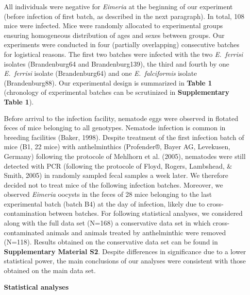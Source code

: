 \documentclass[12pt]{article}
\renewcommand{\_}{\kern-1.5pt\textunderscore\kern-1.5pt}
\begin{document}
All individuals were negative for \textit{Eimeria }at the beginning of our experiment (before infection of first batch, as described in the next paragraph). In total, 108 mice were infected. Mice were randomly allocated to experimental groups ensuring homogeneous distribution of ages and sexes between groups. Our experiments were conducted in four (partially overlapping) consecutive batches for logistical reasons. The first two batches were infected with the two \textit{E. ferrisi }isolates (Brandenburg64 and Brandenburg139), the third and fourth by one \textit{E. ferrisi }isolate (Brandenburg64) and one \textit{E. falciformis }isolate (Brandenburg88). Our experimental design is summarized in \textbf{Table 1} (chronology of experimental batches can be scrutinized in \textbf{Supplementary Table 1}). \par

Before arrival to the infection facility, nematode eggs were observed in flotated feces of mice belonging to all genotypes. Nematode infection is common in breeding facilities (Baker, 1998). Despite treatment of the first infection batch of mice (B1, 22 mice) with anthelminthics (Profender®, Bayer AG, Levekusen, Germany) following the protocole of Mehlhorn et al. (2005), nematodes were still detected with PCR (following the protocole of Floyd, Rogers, Lambshead, $\&$  Smith, 2005) in randomly sampled fecal samples a week later. We therefore decided not to treat mice of the following infection batches. Moreover, we observed \textit{Eimeria }oocysts in the feces of \textcolor[HTML]{CE181E}{28 mice belonging to the last experimental batch (batch B4) at the day of infection, likely due to cross-contamination between batches. For following statistical analyses, we considered along with the full data set (N=168) a conservative data set in which cross-contaminated animals and animals treated by anthelminthic were removed (N=118). Results obtained on the conservative data set can be found in \textbf{Supplementary Material S2}.} Despite differences in significance due to a lower statistical power, t\textcolor[HTML]{00000A}{he main conclusions of our analyses were consistent with those obtained on the main data set.}\par

{\fontsize{14pt}{16.8pt}\selectfont \textbf{Statistical analyses}\par}\par
\end{document}
